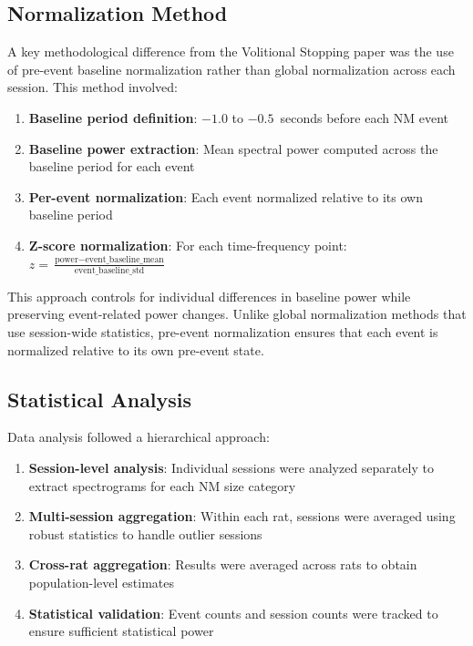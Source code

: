 \documentclass[11pt]{article}
\begin{document}
\subsection{Normalization Method}

A key methodological difference from the Volitional Stopping paper was the use of pre-event baseline normalization rather than global normalization across each session. This method involved:

\begin{enumerate}
\item \textbf{Baseline period definition}: $-1.0$ to $-0.5$~seconds before each NM event
\item \textbf{Baseline power extraction}: Mean spectral power computed across the baseline period for each event
\item \textbf{Per-event normalization}: Each event normalized relative to its own baseline period
\item \textbf{Z-score normalization}: For each time-frequency point: $z = \frac{\text{power} - \text{event\_baseline\_mean}}{\text{event\_baseline\_std}}$
\end{enumerate}

This approach controls for individual differences in baseline power while preserving event-related power changes. Unlike global normalization methods that use session-wide statistics, pre-event normalization ensures that each event is normalized relative to its own pre-event state.

\subsection{Statistical Analysis}

Data analysis followed a hierarchical approach:

\begin{enumerate}
\item \textbf{Session-level analysis}: Individual sessions were analyzed separately to extract spectrograms for each NM size category
\item \textbf{Multi-session aggregation}: Within each rat, sessions were averaged using robust statistics to handle outlier sessions
\item \textbf{Cross-rat aggregation}: Results were averaged across rats to obtain population-level estimates
\item \textbf{Statistical validation}: Event counts and session counts were tracked to ensure sufficient statistical power
\end{enumerate}
\end{document}
